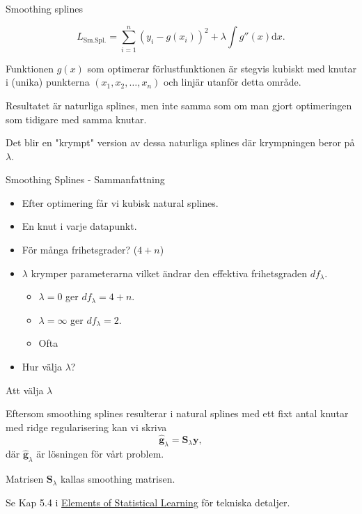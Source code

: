 \documentclass[10pt,english]{beamer}
\begin{document}
\begin{frame}{Smoothing splines}

    \begin{equation*}
        L_{\text{Sm.Spl.}} = \sum_{i=1}^{n}(y_i - g(x_i))^2 + \lambda \int g''(x) \mathrm{d}x.
    \end{equation*}

    \begin{bluebox}
        Funktionen $g(x)$ som optimerar förlustfunktionen är stegvis kubiskt med knutar i (unika) punkterna $(x_1, x_2, \ldots, x_n)$ och linjär utanför detta område.
    \end{bluebox}

    Resultatet är naturliga splines, men inte samma som om man gjort optimeringen som tidigare med samma knutar.

    Det blir en "krympt" version av dessa naturliga splines där krympningen beror på $\lambda$.
    
\end{frame}

\begin{frame}{Smoothing Splines - Sammanfattning}

    \begin{itemize}
        \item Efter optimering får vi kubisk natural splines.
        \item En knut i varje datapunkt.
        \item För många frihetsgrader? ($4+n$)
        \item $\lambda$ krymper parameterarna vilket ändrar den effektiva frihetsgraden $df_{\lambda}$.
        \begin{itemize}
            \item $\lambda = 0$ ger $df_{\lambda} = 4+n$.
            \item $\lambda = \infty$ ger $df_{\lambda} = 2$.
            \item Ofta 
        \end{itemize}
        \item Hur välja $\lambda$?
    \end{itemize}
    
\end{frame}

\begin{frame}{Att välja $\lambda$}
    
    Eftersom smoothing splines resulterar i natural splines med ett fixt antal knutar med ridge regularisering kan vi skriva
    \begin{equation*}
        \hat{\mathbf{g}}_{\lambda} = \mathbf{S}_{\lambda} \mathbf{y},
    \end{equation*}
    där $\hat{\mathbf{g}}_{\lambda}$ är lösningen för vårt problem.

    Matrisen $\mathbf{S}_{\lambda}$ kallas smoothing matrisen.

    Se Kap 5.4 i \href{https://hastie.su.domains/ElemStatLearn/}{Elements of Statistical Learning} för tekniska detaljer.

\end{frame}
\end{document}
